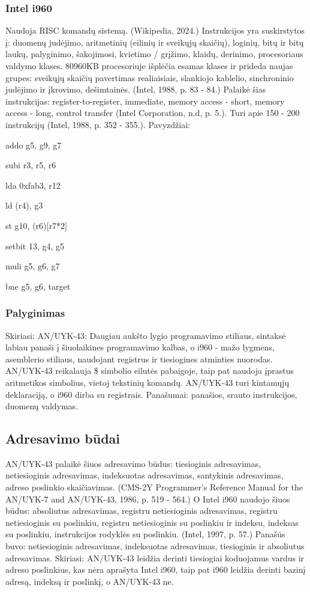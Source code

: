 \documentclass{article}
\begin{document}
\subsubsection{Intel i960}
Naudoja RISC komandų sistemą. (Wikipedia, 2024.) Instrukcijos yra suskirstytos į: duomenų judėjimo, aritmetinių (eilinių ir sveikųjų skaičių), loginių, bitų ir bitų laukų, palyginimo, šakojimosi, kvietimo / grįžimo, klaidų, derinimo, procesoriaus valdymo klases. 80960KB procesoriuje išplėčia esamas klases ir prideda naujas grupes: sveikųjų skaičių pavertimas realiaisiais, slankiojo kablelio, sinchroninio judėjimo ir įkrovimo, dešimtainės. (Intel, 1988, p. 83 - 84.) Palaikė šias instrukcijas: register-to-register, immediate, memory access - short, memory access - long, control transfer (Intel Corporation, n.d, p. 5.). Turi apie 150 - 200 instrukcijų (Intel, 1988, p. 352 - 355.). Pavyzdžiai: 
\item addo g5, g9, g7
\item subi r3, r5, r6
\item lda 0xfab3, r12
\item ld (r4), g3
\item st g10, (r6)[r7*2]
\item setbit 13, g4, g5
\item muli g5, g6, g7
\item bne g5, g6, target
\subsubsection{Palyginimas}
Skiriasi: AN/UYK-43: Daugiau aukšto lygio programavimo stiliaus, sintaksė labiau panaši į šiuolaikines programavimo kalbas, o
i960 - mažo lygmens, asemblerio stiliaus, naudojant registrus ir tiesiogines atminties nuorodas. AN/UYK-43 reikalauja \$ simbolio eilutės pabaigoje, taip pat naudoja įprastus aritmetikos simbolius, vietoj tekstinių komandų. AN/UYK-43 turi kintamųjų deklaraciją, o i960 dirba su registrais. Panašumai: panašios, srauto instrukcijos, duomenų valdymas.
\subsection{Adresavimo būdai}
AN/UYK-43 palaikė šiuos adresavimo būdus: tiesioginis adresavimas, netiesioginis adresavimas, indeksuotas adresavimas, santykinis adresavimas, adreso poslinkio skaičiavimas. (CMS-2Y Programmer's Reference Manual for the AN/UYK-7 and AN/UYK-43, 1986, p. 519 - 564.) O Intel i960 naudojo šiuos būdus: absoliutus adresavimas, registru netiesioginis adresavimas, registru netiesioginis su poslinkiu, registru netiesioginis su poslinkiu ir indeksu, indeksas su poslinkiu, instrukcijos rodyklės su poslinkiu. (Intel, 1997, p. 57.) Panašūs buvo: netiesioginis adresavimas, indeksuotas adresavimas, tiesioginis ir absoliutus adresavimas. Skiriasi:  AN/UYK-43 leidžia derinti tiesiogiai koduojamus vardus ir adreso poslinkius, kas nėra aprašyta Intel i960, taip pat i960 leidžia derinti bazinį adresą, indeksą ir poslinkį, o AN/UYK-43 ne.
\end{document}
